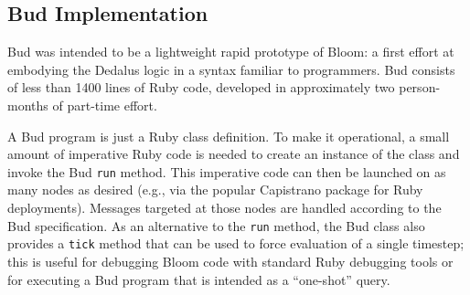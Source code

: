 \begin{comment}
Conventional wisdom in certain quarters says that rule-based languages are untenable for large programs that evolve over time, since the interactions among rules become too difficult to understand.  We believe this concern is an artifact of early rule languages that mixed apparently declarative syntax with imperative constructs and assumptions.  In fact, we demonstrate below that the pure logic-programming roots of Bloom can allow programmers to reason about many program interactions in a much deeper way than traditional imperative languages.
\end{comment}

\subsection{Bud Implementation}

Bud was intended to be a lightweight rapid prototype of Bloom: a first effort at embodying the Dedalus logic in a syntax familiar to programmers.  Bud consists of less than 1400 lines of Ruby code, developed in approximately two person-months of part-time effort.


A Bud program is just a Ruby class definition.  To make it operational, a small
amount of imperative Ruby code is needed to create an instance of the class and
invoke the Bud \texttt{run} method.  This imperative code can then be launched
on as many nodes as desired (e.g., via the popular Capistrano package for Ruby
deployments).  Messages targeted at those nodes are handled according to the Bud
specification.  As an alternative to the \texttt{run} method, the Bud class also
provides a \texttt{tick} method that can be used to force evaluation of a single
timestep; this is useful for debugging Bloom code with standard Ruby debugging
tools or for executing a Bud program that is intended as a ``one-shot'' query.

